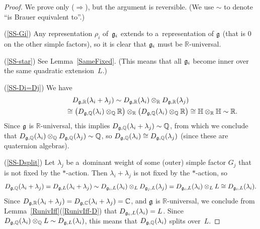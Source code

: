 \documentclass[10pt,a4paper]{amsart}
\numberwithin{equation}{section}
\newcommand{\Lie}[1]{\mathfrak{\lowercase{#1}}}
\begin{document}
\begin{proof}
We prove only ($\Rightarrow$), but the argument is reversible.
(We use $\sim$ to denote ``is Brauer equivalent to''.)

(\ref{SS-Gi}) Any representation $\rho_i$ of~$\Lie G_i$ extends to a~representation of $\Lie G$ (that is $0$ on the
other simple factors), so it is clear that $\Lie G_i$ must be $\mathbb{R}$-universal.

(\ref{SS-star}) See Lemma~\ref{SameFixed}.
(This means that all $\Lie G_i$ become inner over the same quadratic extension~$L$.)

(\ref{SS-Di=Dj}) We have
\begin{gather*}
D_{\Lie G, \mathbb{R}}(\lambda_i + \lambda_j) \sim D_{\Lie G, \mathbb{R}}(\lambda_i) \otimes_\mathbb{R} D_{\Lie G,
\mathbb{R}}(\lambda_j) \\
\hphantom{D_{\Lie G, \mathbb{R}}(\lambda_i + \lambda_j)}{}
\cong \bigl(D_{\Lie G, \mathbb{Q}}(\lambda_i) \otimes_\mathbb{Q} \mathbb{R} \bigr)
\otimes_\mathbb{R} \bigl(D_{\Lie G, \mathbb{Q}}(\lambda_i) \otimes_\mathbb{Q} \mathbb{R} \bigr) \cong \mathbb{H}
\otimes_\mathbb{R} \mathbb{H} \sim \mathbb{R}.
\end{gather*}
Since $\Lie G$ is $\mathbb{R}$-universal, this implies $D_{\Lie G, \mathbb{Q}}(\lambda_i + \lambda_j) \sim\mathbb{Q}$,
from which we conclude that $D_{\Lie G, \mathbb{Q}}(\lambda_i) \otimes_\mathbb{Q} D_{\Lie G, \mathbb{Q}}(\lambda_j) \sim
\mathbb{Q}$, so $D_{\Lie G, \mathbb{Q}}(\lambda_i) \cong D_{\Lie G, \mathbb{Q}}(\lambda_j)$ (since these are quaternion
algebras).

(\ref{SS-Dsplit}) Let $\lambda_j$ be a~dominant weight of some (outer) simple factor $G_j$ that is not f\/ixed by the
$*$-action.
Then $\lambda_i + \lambda_j$ is not f\/ixed by the $*$-action, so
\begin{gather*}
D_{\Lie G, \mathbb{Q}}(\lambda_i + \lambda_j) = D_{\Lie G, L}(\lambda_i + \lambda_j) \sim D_{\Lie G_i, L}(\lambda_i)
\otimes_L D_{\Lie G_j, L}(\lambda_j) = D_{\Lie G_i, L}(\lambda_i) \otimes_L L \cong D_{\Lie G_i, L}(\lambda_i).
\end{gather*}
Since $D_{\Lie G, \mathbb{R}}(\lambda_i + \lambda_j) = D_{\Lie G, \mathbb{C}}(\lambda_i + \lambda_j) = \mathbb{C}$, and
$\Lie G$ is $\mathbb{R}$-universal, we conclude from Lemma~\ref{RunivIff}(\ref{RunivIff-D}) that $D_{\Lie G_i, L}(\lambda_i) = L$.
Since $D_{\Lie G, \mathbb{Q}}(\lambda_i) \otimes_\mathbb{Q} L \sim D_{\Lie G, L}(\lambda_i)$, this means that $D_{\Lie
G, \mathbb{Q}}(\lambda_i)$ splits over~$L$.
\end{proof}
\end{document}
